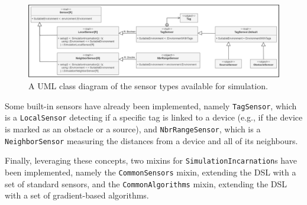 \begin{figure}[!ht]
  \centering
  \includegraphics[width=1\textwidth]{resources/figures/sensor-class-diagram.png}
  \caption{A UML class diagram of the sensor types available for simulation.}
  \label{figure:sensor-class-diagram}
\end{figure}

Some built-in sensors have already been implemented, namely \texttt{TagSensor},
which is a \texttt{LocalSensor} detecting if a specific tag is linked to a
device (e.g., if the device is marked as an obstacle or a source), and
\texttt{NbrRangeSensor}, which is a \texttt{NeighborSensor} measuring the
distances from a device and all of its neighbours.

Finally, leveraging these concepts, two mixins for
\texttt{SimulationIncarnation}s have been implemented, namely the
\texttt{CommonSensors} mixin, extending the \ac{DSL} with a set of standard
sensors, and the \texttt{CommonAlgorithms} mixin, extending the \ac{DSL} with a
set of gradient-based algorithms.
